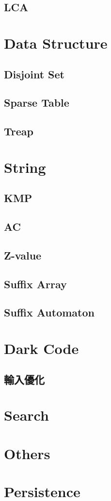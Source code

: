 \subsection{LCA}


\section{Data Structure}

\subsection{Disjoint Set}

\subsection{Sparse Table}

\subsection{Treap}


\section{String}

\subsection{KMP}

\subsection{AC}

\subsection{Z-value}

\subsection{Suffix Array}

\subsection{Suffix Automaton}



\section{Dark Code}

\subsection{輸入優化}


\section{Search}


\section{Others}


\section{Persistence}

